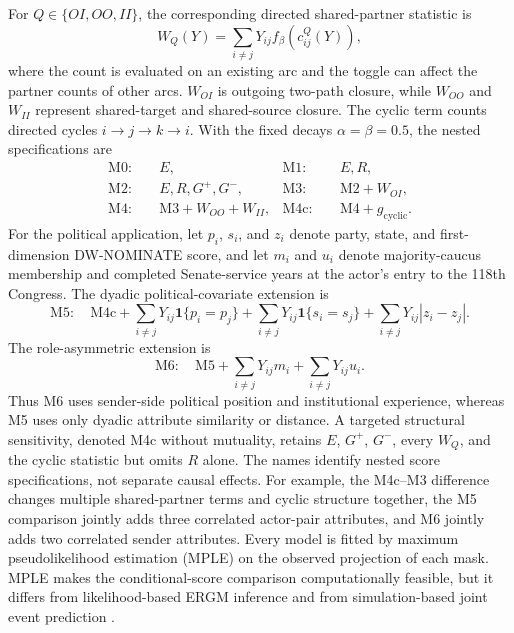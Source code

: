 \documentclass{nws}
\begin{document}
For $Q\in\{OI,OO,II\}$, the corresponding directed shared-partner statistic is
\begin{equation}
 W_Q(Y)=\sum_{i\ne j}Y_{ij}f_\beta\left(c_{ij}^{Q}(Y)\right),
 \label{eq:shared-partner}
\end{equation}
where the count is evaluated on an existing arc and the toggle can affect the partner counts of other arcs. $W_{OI}$ is outgoing two-path closure, while $W_{OO}$ and $W_{II}$ represent shared-target and shared-source closure. The cyclic term counts directed cycles $i\to j\to k\to i$. With the fixed decays $\alpha=\beta=0.5$, the nested specifications are
\begin{align}
 \mathrm{M0}:&\quad E, & \mathrm{M1}:&\quad E,R,\\
 \mathrm{M2}:&\quad E,R,G^+,G^-, & \mathrm{M3}:&\quad \mathrm{M2}+W_{OI},\\
 \mathrm{M4}:&\quad \mathrm{M3}+W_{OO}+W_{II}, & \mathrm{M4c}:&\quad \mathrm{M4}+g_{\mathrm{cyclic}}.
 \label{eq:ergm-ladder}
\end{align}
For the political application, let $p_i$, $s_i$, and $z_i$ denote party, state, and first-dimension DW-NOMINATE score, and let $m_i$ and $u_i$ denote majority-caucus membership and completed Senate-service years at the actor's entry to the 118th Congress. The dyadic political-covariate extension is
\begin{equation}
 \mathrm{M5}:\quad \mathrm{M4c}+
 \sum_{i\ne j}Y_{ij}\mathbf{1}\{p_i=p_j\}+
 \sum_{i\ne j}Y_{ij}\mathbf{1}\{s_i=s_j\}+
 \sum_{i\ne j}Y_{ij}|z_i-z_j|.
 \label{eq:ergm-m5}
\end{equation}
The role-asymmetric extension is
\begin{equation}
 \mathrm{M6}:\quad \mathrm{M5}+
 \sum_{i\ne j}Y_{ij}m_i+
 \sum_{i\ne j}Y_{ij}u_i.
 \label{eq:ergm-m6}
\end{equation}
Thus M6 uses sender-side political position and institutional experience, whereas M5 uses only dyadic attribute similarity or distance. A targeted structural sensitivity, denoted M4c without mutuality, retains $E$, $G^+$, $G^-$, every $W_Q$, and the cyclic statistic but omits $R$ alone. The names identify nested score specifications, not separate causal effects. For example, the M4c--M3 difference changes multiple shared-partner terms and cyclic structure together, the M5 comparison jointly adds three correlated actor-pair attributes, and M6 jointly adds two correlated sender attributes. Every model is fitted by maximum pseudolikelihood estimation (MPLE) on the observed projection of each mask. MPLE makes the conditional-score comparison computationally feasible, but it differs from likelihood-based ERGM inference and from simulation-based joint event prediction \citep{vanDuijnEtAl2009,hunterEtAl2008}.
\end{document}
